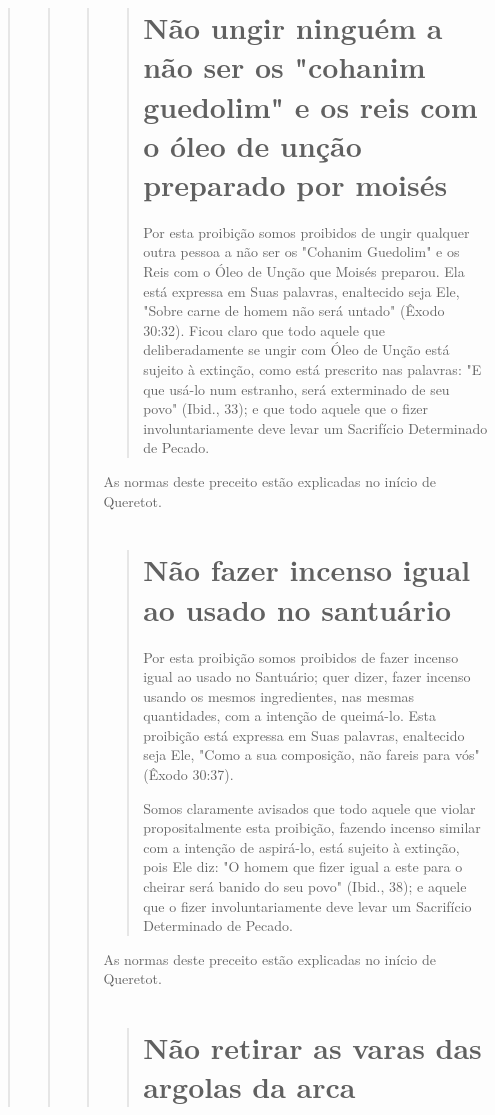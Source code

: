 \begin{quote}
\begin{quote}
\begin{quote}
\begin{quote}
\section{Não ungir ninguém a não ser os "cohanim guedolim" e os reis 
com o óleo de unção preparado por moisés}

Por esta proibição somos proibidos de ungir qualquer outra pessoa a não
ser os "Cohanim Guedolim" e os Reis com o Óleo de Unção que Moisés
preparou. Ela está expressa em Suas palavras, enaltecido seja Ele,
"Sobre carne de homem não será untado" (Êxodo 30:32). Ficou claro que
todo aquele que deliberadamente se ungir com Óleo de Unção está sujeito
à extinção, como es­tá prescrito nas palavras: "E que usá-lo num
estranho, será exterminado de seu povo" (Ibid., 33); e que todo aquele
que o fizer involuntariamente deve levar um Sacrifício Determinado de
Pecado.
\end{quote}

As normas deste preceito estão explicadas no início de Queretot.

\begin{quote}
\section{Não fazer incenso igual ao usado no santuário}

Por esta proibição somos proibidos de fazer incenso igual ao usado no
Santuário; quer dizer, fazer incenso usando os mesmos ingredientes, nas
mes­mas quantidades, com a intenção de queimá-lo. Esta proibição está
expressa em Suas palavras, enaltecido seja Ele, "Como a sua composição,
não fareis para vós" (Êxodo 30:37).

Somos claramente avisados que todo aquele que violar proposital­mente
esta proibição, fazendo incenso similar com a intenção de aspirá-lo,
está sujeito à extinção, pois Ele diz: "O homem que fizer igual a este
para o cheirar será banido do seu povo" (Ibid., 38); e aquele que o
fizer involuntariamente deve levar um Sacrifício Determinado de Pecado.
\end{quote}

As normas deste preceito estão explicadas no início de Queretot.

\begin{quote}
\section{Não retirar as varas das argolas da arca}


\end{quote}
\end{quote}
\end{quote}
\end{quote}
